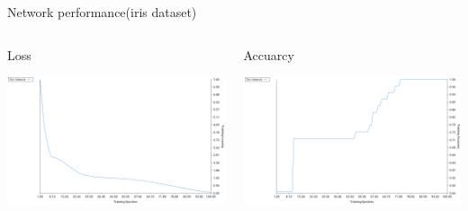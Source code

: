 \documentclass[presentation]{beamer}
\begin{document}
\begin{frame}[label={sec:orgfee0999}]{Network performance(iris dataset)}
\begin{columns}
\begin{column}{0.6\columnwidth}
\begin{block}{Loss}
\begin{center}
\includegraphics[width=.9\linewidth]{./png/single_node_loss.png}
\end{center}
\end{block}
\end{column}

\begin{column}{0.6\columnwidth}
\begin{block}{Accuarcy}
\begin{center}
\includegraphics[width=.9\linewidth]{./png/single_node_acc.png}
\end{center}
\end{block}
\end{column}
\end{columns}
\end{frame}
\end{document}
